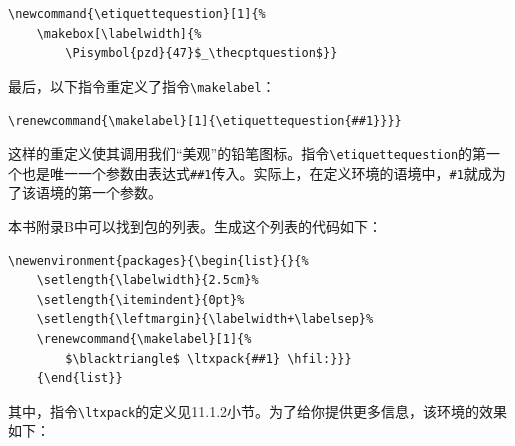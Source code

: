 \begin{dmd}
\begin{verbatim}
\newcommand{\etiquettequestion}[1]{% 
    \makebox[\labelwidth]{%
        \Pisymbol{pzd}{47}$_\thecptquestion$}}\end{verbatim}
\end{dmd}

最后，以下指令重定义了指令\verb|\makelabel|：

\begin{dmd}
\verb|\renewcommand{\makelabel}[1]{\etiquettequestion{##1}}}}|
\end{dmd}

这样的重定义使其调用我们“美观”的铅笔图标。指令\verb|\etiquettequestion|的第一个也是唯一一个参数由表达式\verb+##1+传入。实际上，在定义环境的语境中，\verb|#1|就成为了该语境的第一个参数。

本书附录B中可以找到包的列表。生成这个列表的代码如下：

\begin{dmd}
\begin{verbatim}
\newenvironment{packages}{\begin{list}{}{%
    \setlength{\labelwidth}{2.5cm}%
    \setlength{\itemindent}{0pt}% 
    \setlength{\leftmargin}{\labelwidth+\labelsep}% 
    \renewcommand{\makelabel}[1]{%
        $\blacktriangle$ \ltxpack{##1} \hfil:}}}
    {\end{list}}\end{verbatim}
\end{dmd}

\newenvironment{packages}{\begin{list}{}{%
    \setlength{\labelwidth}{2.5cm}%
    \setlength{\itemindent}{0pt}%
    \setlength{\leftmargin}{\labelwidth+\labelsep}%
    \renewcommand{\makelabel}[1]{%
        \textsf{##1} \hfil:}}}
    {\end{list}}

其中，指令\verb|\ltxpack|的定义见11.1.2小节。为了给你提供更多信息，该环境的效果如下：


